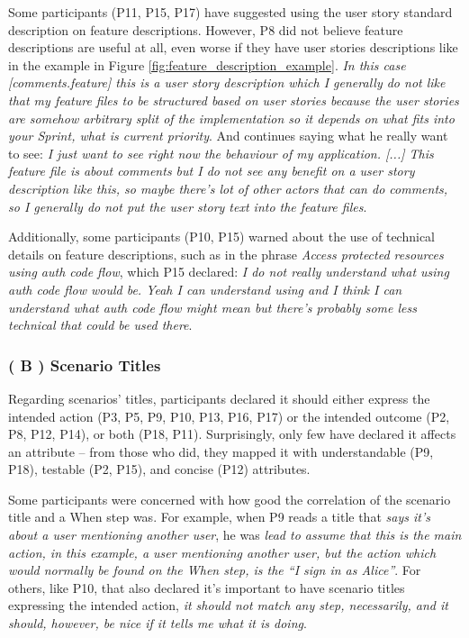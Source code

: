 Some participants (P11, P15, P17) have suggested using the user story standard description on feature descriptions. However, P8 did not believe feature descriptions are useful at all, even worse if they have user stories descriptions like in the example in Figure \ref{fig:feature_description_example}. \textit{In this case [comments.feature] this is a user story description which I generally do not like that my feature files to be structured based on user stories because the user stories are somehow arbitrary split of the implementation so it depends on what fits into your Sprint, what is current priority}. And continues saying what he really want to see: \textit{I just want to see right now the behaviour of my application. [...] This feature file is about comments but I do not see any benefit on a user story description like this, so maybe there's lot of other actors that can do comments, so I generally do not put the user story text into the feature files}.

Additionally, some participants (P10, P15) warned about the use of technical details on feature descriptions, such as in the phrase \textit{Access protected resources using auth code flow}, which P15 declared: \textit{I do not really understand what using auth code flow would be. Yeah I can understand \textit{using} and I think I can understand what \textit{auth code flow} might mean but there's probably some less technical that could be used there}.

\subsubsection{\textbf{( B ) Scenario Titles}}
Regarding scenarios' titles, participants declared it should either express the intended action (P3, P5, P9, P10, P13, P16, P17) or the intended outcome (P2, P8, P12, P14), or both (P18, P11). Surprisingly, only few have declared it affects an attribute -- from those who did, they mapped it with understandable (P9, P18), testable (P2, P15), and concise (P12) attributes.

Some participants were concerned with how good the correlation of the scenario title and a When step was. For example, when P9 reads a title that \textit{says it's about a user mentioning another user}, he was \textit{lead to assume that this is the main action, in this example, a user mentioning another user, but the action which would normally be found on the When step, is the ``I sign in as Alice''}. For others, like P10, that also declared it's important to have scenario titles expressing the intended action, \textit{it should not match any step, necessarily, and it should, however, be nice if it tells me what it is doing}.

